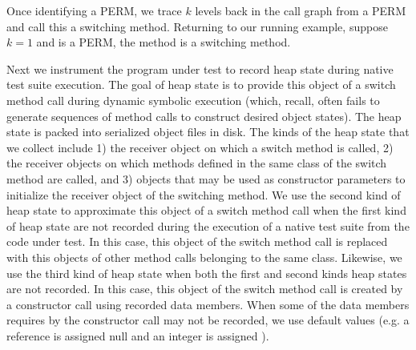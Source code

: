 

Once identifying a PERM, we trace $k$ levels back in the call graph from a PERM and call this a switching method.  Returning to our running example, suppose $k = 1$ and  is a PERM, the method  is a switching method.  

Next we instrument the program under test to record heap state during native test suite execution. The goal of heap state is to provide this object of a switch method call during dynamic symbolic execution (which, recall, often fails to generate sequences of method calls to construct desired object states). The heap state is packed into serialized object files in disk. The kinds of the heap state that we collect include 1) the receiver object on which a switch method is called, 2) the receiver objects on which methods defined in the same class of the switch method are called, and 3) objects that may be used as constructor parameters to initialize the receiver object of the switching method. We use the second kind of heap state to approximate this object of a switch method call when the first kind of heap state are not recorded during the execution of a native test suite from the code under test. In this case, this object of the switch method call is replaced with this objects of other method calls belonging to the same class.  Likewise, we use the third kind of heap state when both the first and second kinds heap states are not recorded. In this case, this object of the switch method call is created by a constructor call using recorded data members.  When some of the data members requires by the constructor call may not be recorded, we use default values (e.g. a reference is assigned null and an integer is assigned ).  

